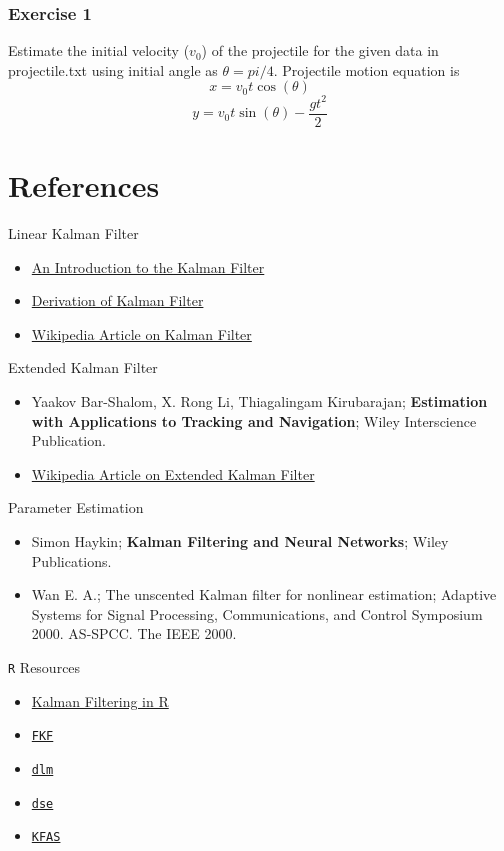\documentclass{article}
\begin{document}
\subsubsection*{Exercise 1}
Estimate the initial velocity ($v_0$) of the projectile for the given data in projectile.txt using initial angle as $\theta = pi/4$. Projectile motion equation is 
$$x=v_0t\cos(\theta)$$
$$y=v_0t\sin(\theta)-\frac{gt^2}{2}$$
\section{References}

Linear Kalman Filter
\begin{itemize}
\item \href{http://www.cs.unc.edu/~tracker/media/pdf/SIGGRAPH2001_CoursePack_08.pdf}{An Introduction to the Kalman Filter}
\item \href{http://www.robots.ox.ac.uk/~ian/Teaching/Estimation/LectureNotes2.pdf}{Derivation of Kalman Filter}
\item \href{https://en.wikipedia.org/wiki/Kalman_filter}{Wikipedia Article on Kalman Filter}
\end{itemize}
Extended Kalman Filter
\begin{itemize}
\item Yaakov Bar-Shalom, X. Rong Li, Thiagalingam Kirubarajan; \textbf{Estimation with Applications to Tracking and Navigation}; Wiley Interscience Publication.
\item \href{https://en.wikipedia.org/wiki/Extended_Kalman_filter}{Wikipedia Article on Extended Kalman Filter}
\end{itemize}
Parameter Estimation
\begin{itemize}
\item Simon Haykin; \textbf{Kalman Filtering and Neural Networks}; Wiley Publications.
\item Wan E. A.; The unscented Kalman filter for nonlinear estimation; Adaptive Systems for Signal Processing, Communications, and Control Symposium 2000. AS-SPCC. The IEEE 2000.
\end{itemize}
\verb|R| Resources
\begin{itemize}
\item \href{http://core.ac.uk/download/pdf/6340262.pdf}{Kalman Filtering in R}
\item \href{https://cran.r-project.org/web/packages/FKF/FKF.pdf}{\tt FKF}
\item \href{https://cran.r-project.org/web/packages/dlm/dlm.pdf}{\tt dlm}
\item \href{https://cran.r-project.org/web/packages/dse/dse.pdf}{\tt dse}
\item \href{https://cran.r-project.org/web/packages/KFAS/KFAS.pdf}{\tt KFAS}
\end{itemize}
\end{document}
